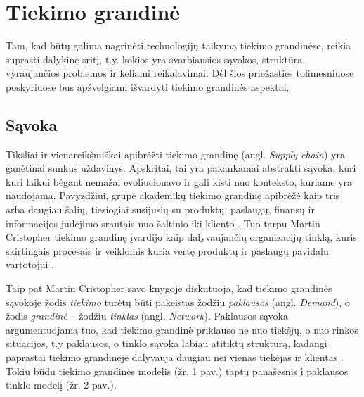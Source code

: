 
\section {Tiekimo grandinė}

Tam, kad būtų galima nagrinėti technologijų taikymą tiekimo grandinėse, reikia suprasti dalykinę sritį, t.y. kokios yra svarbiausios sąvokos, struktūra, vyraujančios problemos ir keliami reikalavimai. Dėl šios priežasties tolimesniuose poskyriuose bus apžvelgiami išvardyti tiekimo grandinės aspektai.




\subsection{Sąvoka}

Tiksliai ir vienareikšmiškai apibrėžti tiekimo grandinę (angl. \textit{Supply chain}) yra ganėtinai sunkus uždavinys. Apskritai, tai yra pakankamai abstrakti sąvoka, kuri kuri laikui bėgant nemažai evoliucionavo ir gali kisti nuo konteksto, kuriame yra naudojama. Pavyzdžiui, grupė akademikų tiekimo grandinę apibrėžė kaip tris arba daugiau šalių, tiesiogiai susijusių su produktų, paslaugų, finansų ir informacijos judėjimo srautais nuo šaltinio iki kliento \cite{mentzer2001defining}. Tuo tarpu Martin Cristopher tiekimo grandinę įvardijo kaip dalyvaujančių organizacijų tinklą, kuris skirtingais procesais ir veiklomis kuria vertę produktų ir paslaugų pavidalu vartotojui \cite{christopher2016logistics}. 

Taip pat Martin Cristopher savo knygoje diskutuoja, kad tiekimo grandinės sąvokoje žodis \textit{tiekimo} turėtų būti pakeistas žodžiu \textit{paklausos} (angl. \textit{Demand}), o žodis \textit{grandinė} – žodžiu \textit{tinklas} (angl. \textit{Network}). Paklausos sąvoka argumentuojama tuo, kad tiekimo grandinė priklauso ne nuo tiekėjų, o nuo rinkos situacijos, t.y paklausos, o tinklo sąvoka labiau atitiktų struktūrą, kadangi paprastai tiekimo grandinėje dalyvauja daugiau nei vienas tiekėjas ir klientas \cite{christopher2016logistics}. Tokiu būdu tiekimo grandinės modelis (žr. 1 pav.) taptų panašesnis į paklausos tinklo modelį (žr. 2 pav.).

